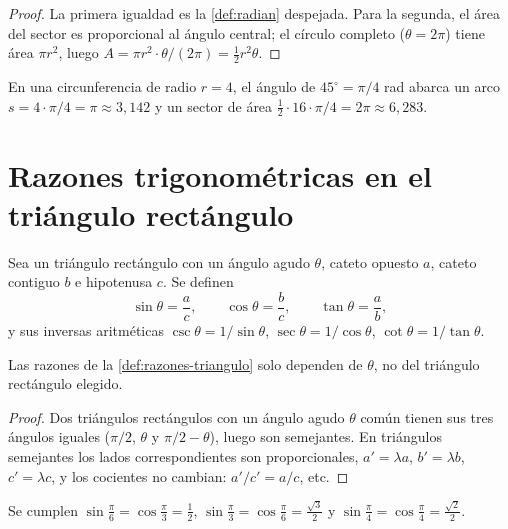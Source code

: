 \begin{proof}
La primera igualdad es la \cref{def:radian} despejada. Para la segunda, el área del sector es proporcional al ángulo central; el círculo completo ($\theta=2\pi$) tiene área $\pi r^{2}$, luego $A=\pi r^{2}\cdot\theta/(2\pi)=\tfrac12 r^{2}\theta$.
\end{proof}

\begin{ejemplo}\label{ej:arco}
En una circunferencia de radio $r=4$, el ángulo de $45^{\circ}=\pi/4$ rad abarca un arco $s=4\cdot\pi/4=\pi\approx 3{,}142$ y un sector de área $\tfrac12\cdot 16\cdot\pi/4=2\pi\approx 6{,}283$.
\end{ejemplo}

\section{Razones trigonométricas en el triángulo rectángulo}

\begin{definicion}\label{def:razones-triangulo}
Sea un triángulo rectángulo con un ángulo agudo $\theta$, cateto opuesto $a$, cateto contiguo $b$ e hipotenusa $c$. Se definen
\[
\sin\theta=\frac{a}{c},\qquad \cos\theta=\frac{b}{c},\qquad \tan\theta=\frac{a}{b},
\]
y sus inversas aritméticas $\csc\theta=1/\sin\theta$, $\sec\theta=1/\cos\theta$, $\cot\theta=1/\tan\theta$.
\end{definicion}

\begin{proposicion}\label{prop:razones-bien-definidas}
Las razones de la \cref{def:razones-triangulo} solo dependen de $\theta$, no del triángulo rectángulo elegido.
\end{proposicion}

\begin{proof}
Dos triángulos rectángulos con un ángulo agudo $\theta$ común tienen sus tres ángulos iguales ($\pi/2$, $\theta$ y $\pi/2-\theta$), luego son semejantes. En triángulos semejantes los lados correspondientes son proporcionales, $a'=\lambda a$, $b'=\lambda b$, $c'=\lambda c$, y los cocientes no cambian: $a'/c'=a/c$, etc.
\end{proof}

\begin{proposicion}\label{prop:notables}
Se cumplen $\sin\frac{\pi}{6}=\cos\frac{\pi}{3}=\frac12$, $\sin\frac{\pi}{3}=\cos\frac{\pi}{6}=\frac{\sqrt3}{2}$ y $\sin\frac{\pi}{4}=\cos\frac{\pi}{4}=\frac{\sqrt2}{2}$.
\end{proposicion}

